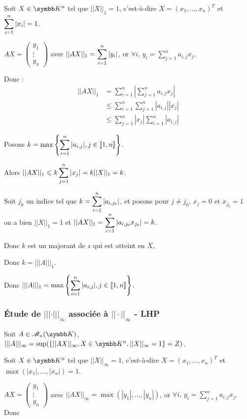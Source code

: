 Soit $X \in \K^n$ tel que $||X||_1 = 1$, c'est-à-dire $X = (x_1, \ldots, x_n)^T$ et $\displaystyle \sum_{i=1}^n |x_i| = 1$.

$AX = \begin{pmatrix}
    y_1 \\
    \vdots \\
    y_n
\end{pmatrix}$  avec $\displaystyle ||AX||_1 = \sum_{i=1}^n |y_i|$, 
or $\displaystyle \forall i, \, y_i = \sum_{j=1}^n a_{i, j} x_j$. 

Donc :
\begin{align*}
    || AX ||_1 & = \sum_{i=1}^n \left| \sum_{j=1}^n a_{i, j} x_j \right| \\
    & \leqslant \sum_{i=1}^n \sum_{j=1}^n |a_{i, j}| |x_j| \\
    & \leqslant \sum_{j=1}^n |x_j| \sum_{i=1}^n |a_{i, j}| 
\end{align*}

Posons $\displaystyle k = \max \left\{ \sum_{i=1}^n |a_{i, j}|, j \in [\![1, n]\!] \right\}$.

Alors $\displaystyle ||AX||_1 \leqslant k \sum_{j=1}^n |x_j| = k ||X||_1 = k$.


Soit $j_0$ un indice tel que $\displaystyle k = \sum_{i=1}^n |a_{i, j_0}|$, et posons pour 
$j \neq j_0, \, x_j = 0$ et $x_{j_0} = 1$ on a bien $||X||_1 = 1$ et
$\displaystyle ||AX||_1 = \sum_{i=1}^n |a_{i, j_0} x_{j_0}| = k$.

Donc $k$ est un majorant de $z$ qui est atteint en $X$,

Donc $k = |||A|||_1$.

Donc $\displaystyle |||A|||_1 = \max \left\{ \sum_{i=1}^n |a_{i, j}|, j \in [\![1, n]\!] \right\}$.

\subsubsection{Étude de $||| \cdot |||_\infty$ associée à $|| \cdot ||_\infty$ - LHP}
Soit $A \in \mathscr M_n(\K)$, $|||A|||_\infty = \sup (\{ ||AX||_\infty, X \in \K^n, ||X||_\infty = 1 \} = Z) $.

Soit $X \in \K^n$ tel que $||X||_\infty = 1$, c'est-à-dire $X = (x_1, \ldots, x_n)^T$ et $\max(|x_1|, \ldots, |x_n|) = 1$.

$AX = \begin{pmatrix}
    y_1 \\
    \vdots \\
    y_n
\end{pmatrix}$  avec $||AX||_\infty = \max(|y_1|, \ldots, |y_n|)$, 
or $\displaystyle \forall i, \, y_i = \sum_{j=1}^n a_{i, j} x_j$. Donc 

